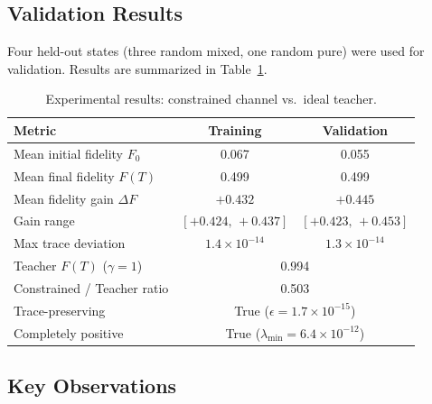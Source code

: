 \documentclass[11pt,a4paper]{article}
\begin{document}
\subsection{Validation Results}

Four held-out states (three random mixed, one random pure) were
used for validation.  Results are summarized in Table~\ref{tab:results}.

\begin{table}[ht]
\centering
\caption{Experimental results: constrained channel vs.\ ideal teacher.}
\label{tab:results}
\begin{tabular}{@{}lcc@{}}
\toprule
Metric & Training & Validation \\
\midrule
Mean initial fidelity $F_0$       & 0.067 & 0.055 \\
Mean final fidelity $F(T)$        & 0.499 & 0.499 \\
Mean fidelity gain $\Delta F$     & $+0.432$ & $+0.445$ \\
Gain range                        & $[+0.424,\,+0.437]$ & $[+0.423,\,+0.453]$ \\
Max trace deviation               & $1.4\times10^{-14}$ & $1.3\times10^{-14}$ \\
\midrule
Teacher $F(T)$ ($\gamma=1$)       & \multicolumn{2}{c}{0.994} \\
Constrained / Teacher ratio       & \multicolumn{2}{c}{0.503} \\
\midrule
Trace-preserving                  & \multicolumn{2}{c}{True ($\epsilon=1.7\times10^{-15}$)} \\
Completely positive               & \multicolumn{2}{c}{True ($\lambda_{\min}=6.4\times10^{-12}$)} \\
\bottomrule
\end{tabular}
\end{table}

\subsection{Key Observations}
\end{document}
